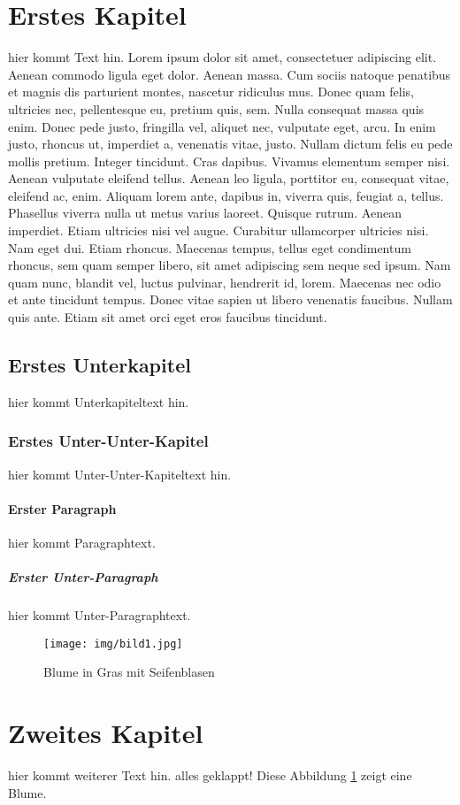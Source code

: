 \documentclass[11pt]{article}
\begin{document}
\tableofcontents
\newpage
\listoffigures
\newpage



\section{Erstes Kapitel}
hier kommt Text hin.
Lorem ipsum dolor sit amet, consectetuer adipiscing elit. Aenean commodo ligula eget dolor. Aenean massa. Cum sociis natoque penatibus et magnis dis parturient montes, nascetur ridiculus mus. Donec quam felis, ultricies nec, pellentesque eu, pretium quis, sem. Nulla consequat massa quis enim. Donec pede justo, fringilla vel, aliquet nec, vulputate eget, arcu. In enim justo, rhoncus ut, imperdiet a, venenatis vitae, justo. Nullam dictum felis eu pede mollis pretium. Integer tincidunt. Cras dapibus. Vivamus elementum semper nisi. Aenean vulputate eleifend tellus. Aenean leo ligula, porttitor eu, consequat vitae, eleifend ac, enim. Aliquam lorem ante, dapibus in, viverra quis, feugiat a, tellus. Phasellus viverra nulla ut metus varius laoreet. Quisque rutrum. Aenean imperdiet. Etiam ultricies nisi vel augue. Curabitur ullamcorper ultricies nisi. Nam eget dui. Etiam rhoncus. Maecenas tempus, tellus eget condimentum rhoncus, sem quam semper libero, sit amet adipiscing sem neque sed ipsum. Nam quam nunc, blandit vel, luctus pulvinar, hendrerit id, lorem. Maecenas nec odio et ante tincidunt tempus. Donec vitae sapien ut libero venenatis faucibus. Nullam quis ante. Etiam sit amet orci eget eros faucibus tincidunt.

\subsection{Erstes Unterkapitel}
hier kommt Unterkapiteltext hin.

\subsubsection{Erstes Unter-Unter-Kapitel}
hier kommt Unter-Unter-Kapiteltext hin.

\paragraph{Erster Paragraph}
hier kommt Paragraphtext.

\subparagraph{Erster Unter-Paragraph}
hier kommt Unter-Paragraphtext.

\begin{figure}
    \centering
    \texttt{[image: img/bild1.jpg]}
    \caption[Blume]{Blume in Gras mit Seifenblasen}
    \label{fig: Blume}
\end{figure}


\section{Zweites Kapitel}

hier kommt weiterer Text hin.
alles geklappt!
Diese Abbildung \ref{fig: Blume} zeigt eine Blume.
\end{document}
